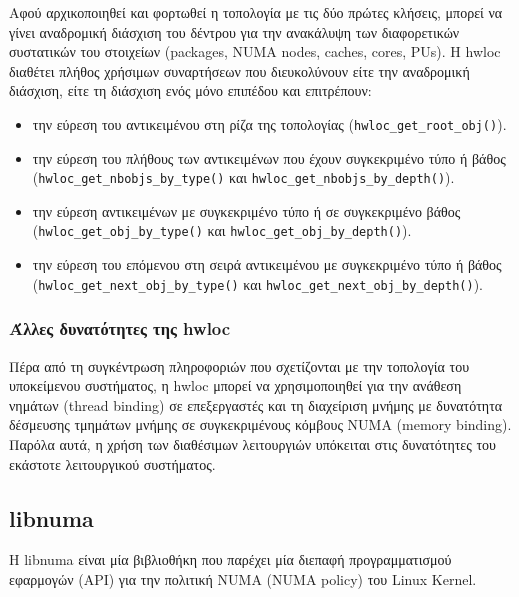 Αφού αρχικοποιηθεί και φορτωθεί η τοπολογία με τις δύο πρώτες κλήσεις, μπορεί να γίνει αναδρομική διάσχιση του δέντρου για την ανακάλυψη των διαφορετικών συστατικών του στοιχείων (packages, NUMA nodes, caches, cores, PUs). Η hwloc διαθέτει πλήθος χρήσιμων συναρτήσεων που διευκολύνουν είτε την αναδρομική διάσχιση, είτε τη διάσχιση ενός μόνο επιπέδου και επιτρέπουν:
\begin{itemize}
	\item την εύρεση του αντικειμένου στη ρίζα της τοπολογίας (\texttt{hwloc\_get\_root\_obj()}).
	\item την εύρεση του πλήθους των αντικειμένων που έχουν συγκεκριμένο τύπο ή βάθος (\texttt{hwloc\_get\_nbobjs\_by\_type()} και \texttt{hwloc\_get\_nbobjs\_by\_depth()}).
	\item την εύρεση αντικειμένων με συγκεκριμένο τύπο ή σε συγκεκριμένο βάθος (\texttt{hwloc\_get\_obj\_by\_type()} και \texttt{hwloc\_get\_obj\_by\_depth()}).
	\item την εύρεση του επόμενου στη σειρά αντικειμένου με συγκεκριμένο τύπο ή βάθος (\texttt{hwloc\_get\_next\_obj\_by\_type()} και \texttt{hwloc\_get\_next\_obj\_by\_depth()}).
\end{itemize}


\subsubsection{Άλλες δυνατότητες της hwloc}
Πέρα από τη συγκέντρωση πληροφοριών που σχετίζονται με την τοπολογία του υποκείμενου συστήματος, η hwloc μπορεί να χρησιμοποιηθεί για την ανάθεση νημάτων (thread binding) σε επεξεργαστές και τη διαχείριση μνήμης με δυνατότητα δέσμευσης τμημάτων μνήμης σε συγκεκριμένους κόμβους NUMA (memory binding). Παρόλα αυτά, η χρήση των διαθέσιμων λειτουργιών υπόκειται στις δυνατότητες του εκάστοτε λειτουργικού συστήματος.


\subsection{libnuma}
Η libnuma είναι μία βιβλιοθήκη που παρέχει μία διεπαφή προγραμματισμού εφαρμογών (API) για την πολιτική NUMA (NUMA policy) του Linux Kernel.

